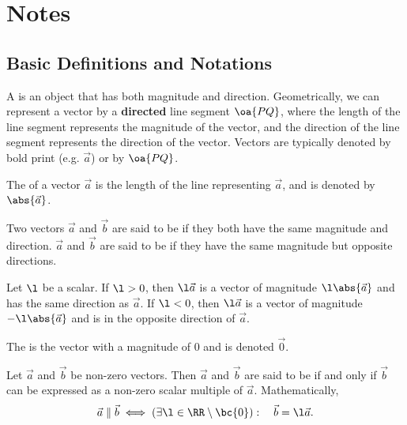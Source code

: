 \section{Notes}

\subsection{Basic Definitions and Notations}

\begin{definition}
    A  is an object that has both magnitude and direction. Geometrically, we can represent a vector by a \textbf{directed} line segment $\oa{PQ}$, where the length of the line segment represents the magnitude of the vector, and the direction of the line segment represents the direction of the vector. Vectors are typically denoted by bold print (e.g. $\vec a$) or by $\oa{PQ}$.
\end{definition}

\begin{definition}
    The  of a vector $\vec a$ is the length of the line representing $\vec a$, and is denoted by $\abs{\vec a}$.
\end{definition}

\begin{definition}
    Two vectors $\vec a$ and $\vec b$ are said to be  if they both have the same magnitude and direction. $\vec a$ and $\vec b$ are said to be  if they have the same magnitude but opposite directions.
\end{definition}

\begin{definition}
    Let $\l$ be a scalar. If $\l > 0$, then $\l \vec a$ is a vector of magnitude $\l \abs{\vec a}$ and has the same direction as $\vec a$. If $\l < 0$, then $\l \vec a$ is a vector of magnitude $-\l \abs{\vec a}$ and is in the opposite direction of $\vec a$.
\end{definition}

\begin{definition}
    The  is the vector with a magnitude of 0 and is denoted $\vec 0$.
\end{definition}

\begin{definition}
    Let $\vec a$ and $\vec b$ be non-zero vectors. Then $\vec a$ and $\vec b$ are said to be  if and only if $\vec b$ can be expressed as a non-zero scalar multiple of $\vec a$. Mathematically, \[\vec a \parallel \vec b \iff (\exists \l \in \RR \setminus \bc{0}): \quad \vec b = \l \vec a.\]
\end{definition}

